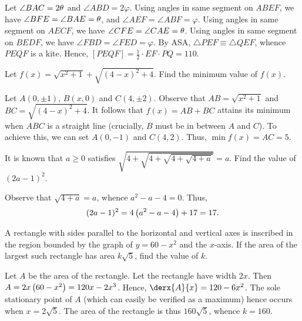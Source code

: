 \begin{solution*}
    Let $\angle BAC = 2\theta$ and $\angle ABD = 2\varphi$. Using angles in same segment on $ABEF$, we have $\angle BFE = \angle BAE = \theta$, and $\angle AEF = \angle ABF = \varphi$. Using angles in same segment on $AECF$, we have $\angle CFE = \angle CAE = \theta$. Using angles in same segment on $BEDF$, we have $\angle FBD = \angle FED = \varphi$. By ASA, $\triangle PEF \equiv \triangle QEF$, whence $PEQF$ is a kite. Hence, $[PEQF] = \frac12 \cdot EF \cdot PQ = 110$.
\end{solution*}

\begin{question}[5]\label{A::2024-O-1-8}
    Let $f(x) = \sqrt{x^2 + 1} + \sqrt{(4-x)^2 + 4}$. Find the minimum value of $f(x)$.
\end{question}
\begin{solution*}
    Let $A(0, \pm1)$, $B(x, 0)$ and $C(4, \pm2)$. Observe that  $AB = \sqrt{x^2 + 1}$ and $BC = \sqrt{(4-x)^2 + 4}$. It follows that $f(x) = AB + BC$ attains its minimum when $ABC$ is a straight line (crucially, $B$ must be in between $A$ and $C$). To achieve this, we can set $A(0, -1)$ and $C(4, 2)$. Thus, $\min f(x) = AC = 5$.
\end{solution*}

\begin{question}[17]\label{A::2024-O-1-9}
    It is known that $a \geq 0$ satisfies $\sqrt{4 + \sqrt{4 + \sqrt{4 + \sqrt{4 + a}}}} = a$. Find the value of $(2a - 1)^2$.
\end{question}
\begin{solution*}
    Observe that $\sqrt{4 + a} = a$, whence $a^2 - a - 4 = 0$. Thus, \[(2a-1)^2 = 4\left( a^2 - a - 4 \right) + 17 = 17.\]
\end{solution*}

\begin{question}[160]\label{A::2024-O-1-10}
    A rectangle with sides parallel to the horizontal and vertical axes is inscribed in the region bounded by the graph of $y = 60 - x^2$ and the $x$-axis. If the area of the largest such rectangle has area $k\sqrt 5$, find the value of $k$.
\end{question}
\begin{solution*}
    Let $A$ be the area of the rectangle. Let the rectangle have width $2x$. Then $A = 2x\left( 60 - x^2 \right) = 120x - 2x^3$. Hence, $\derx{A}{x} = 120 - 6x^2$. The sole stationary point of $A$ (which can easily be verified as a maximum) hence occurs when $x = 2\sqrt5$. The area of the rectangle is thus $160\sqrt5$, whence $k = 160$.
\end{solution*}

